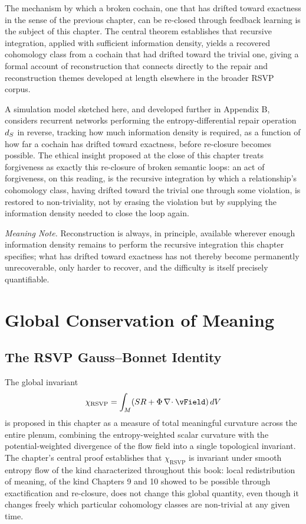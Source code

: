 The mechanism by which a broken cochain, one that has drifted toward exactness in the sense of the previous chapter, can be re-closed through feedback learning is the subject of this chapter. The central theorem establishes that recursive integration, applied with sufficient information density, yields a recovered cohomology class from a cochain that had drifted toward the trivial one, giving a formal account of reconstruction that connects directly to the repair and reconstruction themes developed at length elsewhere in the broader RSVP corpus.

A simulation model sketched here, and developed further in Appendix B, considers recurrent networks performing the entropy-differential repair operation $d_{S}$ in reverse, tracking how much information density is required, as a function of how far a cochain has drifted toward exactness, before re-closure becomes possible. The ethical insight proposed at the close of this chapter treats forgiveness as exactly this re-closure of broken semantic loops: an act of forgiveness, on this reading, is the recursive integration by which a relationship's cohomology class, having drifted toward the trivial one through some violation, is restored to non-triviality, not by erasing the violation but by supplying the information density needed to close the loop again.

\emph{Meaning Note.} Reconstruction is always, in principle, available wherever enough information density remains to perform the recursive integration this chapter specifies; what has drifted toward exactness has not thereby become permanently unrecoverable, only harder to recover, and the difficulty is itself precisely quantifiable.

\part{Global Conservation of Meaning}

\chapter{The RSVP Gauss--Bonnet Identity}

The global invariant
\[
\chi_{\mathrm{RSVP}} = \int_M (\SEntropy R + \PhiField \, \diverg \vField) \, dV
\]
is proposed in this chapter as a measure of total meaningful curvature across the entire plenum, combining the entropy-weighted scalar curvature with the potential-weighted divergence of the flow field into a single topological invariant. The chapter's central proof establishes that $\chi_{\mathrm{RSVP}}$ is invariant under smooth entropy flow of the kind characterized throughout this book: local redistribution of meaning, of the kind Chapters 9 and 10 showed to be possible through exactification and re-closure, does not change this global quantity, even though it changes freely which particular cohomology classes are non-trivial at any given time.

